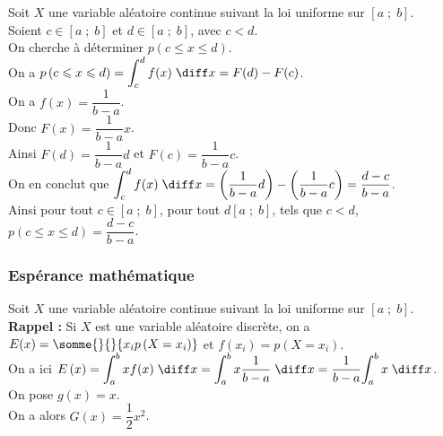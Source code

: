 Soit $X$ une variable aléatoire continue suivant la loi uniforme sur $\left[a \; ; \; b\right]$. \\
Soient $c \in \left[a \; ; \; b\right]$ et $d \in \left[ a\; ; \; b\right]$, avec $c < d$. \\

On cherche à déterminer $p\left(c \leqslant x \leqslant d\right)$. \\

On a $p\left(c \leqslant x \leqslant d\right) = \displaystyle{\int_c^d f(x) \; \diff x} = F(d) - F(c)$. \\

On a $f(x) = \dfrac{1}{b-a}$. \\

Donc $F(x) = \dfrac{1}{b-a}x$. \\

Ainsi $F(d) = \dfrac{1}{b-a}d$ et $F(c) = \dfrac{1}{b-a}c$. \\

On en conclut que $\displaystyle{\int_c^d f(x) \; \diff x} = \left(\dfrac{1}{b-a}d\right)-\left(\dfrac{1}{b-a}c\right) = \dfrac{d-c}{b-a}$. \\

Ainsi pour tout $c \in \left[a \; ; \; b\right]$, pour tout $d\left[a \; ; \; b\right]$, tels que $c < d$, $p\left(c \leqslant x \leqslant d\right) = \dfrac{d-c}{b-a}$.

\subsubsection{Espérance mathématique}

Soit $X$ une variable aléatoire continue suivant la loi uniforme sur $\left[a \; ; \; b\right]$. \\

\textbf{Rappel :} Si $X$ est une variable aléatoire discrète, on a $E(x) = \somme{}{}{x_ip\left(X=x_i\right)}$ et $f\left(x_i\right) = p\left(X=x_i\right)$. \\

On a ici $E\left(x\right) = \displaystyle{\int_a^b xf(x) \; \diff x} = \displaystyle{\int_a^b x\dfrac{1}{b-a} \; \diff x} = \dfrac{1}{b-a}\displaystyle{\int_a^b x \; \diff x}$. \\

On pose $g(x) = x$. \\

On a alors $G(x) = \dfrac{1}{2}x^2$. \\

